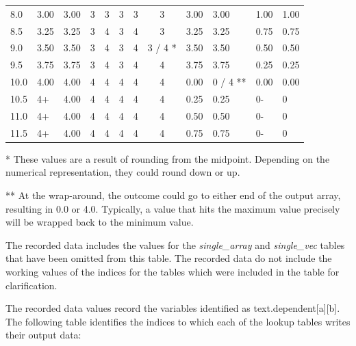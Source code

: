 \documentclass[11pt,fleqn]{report}
\begin{document}
\begin{table}[ht]
\begin{center}
\begin{tabular}{|l||l|l|c|c|c|c|c||l|l||l|l||}
8.0  & 3.00 & 3.00 & 3 & 3 & 3 & 3 & 3       & 3.00 & 3.00     & 1.00 & 1.00 \\
8.5  & 3.25 & 3.25 & 3 & 4 & 3 & 4 & 3       & 3.25 & 3.25     & 0.75 & 0.75 \\
9.0  & 3.50 & 3.50 & 3 & 4 & 3 & 4 & 3 / 4 * & 3.50 & 3.50     & 0.50 & 0.50 \\
9.5  & 3.75 & 3.75 & 3 & 4 & 3 & 4 & 4       & 3.75 & 3.75     & 0.25 & 0.25 \\
10.0 & 4.00 & 4.00 & 4 & 4 & 4 & 4 & 4       & 0.00 & 0 / 4 ** & 0.00 & 0.00 \\
10.5 & 4+   & 4.00 & 4 & 4 & 4 & 4 & 4       & 0.25 & 0.25     & 0-   & 0    \\
11.0 & 4+   & 4.00 & 4 & 4 & 4 & 4 & 4       & 0.50 & 0.50     & 0-   & 0    \\
11.5 & 4+   & 4.00 & 4 & 4 & 4 & 4 & 4       & 0.75 & 0.75     & 0-   & 0    \\
\hline
\end{tabular}
\medskip
\end{center}
\end{table}


* These values are a result of rounding from the midpoint.  Depending on the
numerical representation, they could round down or up.

** At the wrap-around, the outcome could go to either end of the output
array, resulting in 0.0 or 4.0.  Typically, a value that hits the maximum
value precisely will be wrapped back to the minimum value.

The recorded data includes the values for the \textit{single\_array} and
\textit{single\_vec} tables that have been omitted from this table.  The
recorded data do not include the working values of the indices for the
tables which were included in the table for clarification.

The recorded data values record the variables identified as
text.dependent[a][b].  The following table identifies the indices to which each
of the lookup tables writes their output data:
\end{document}
